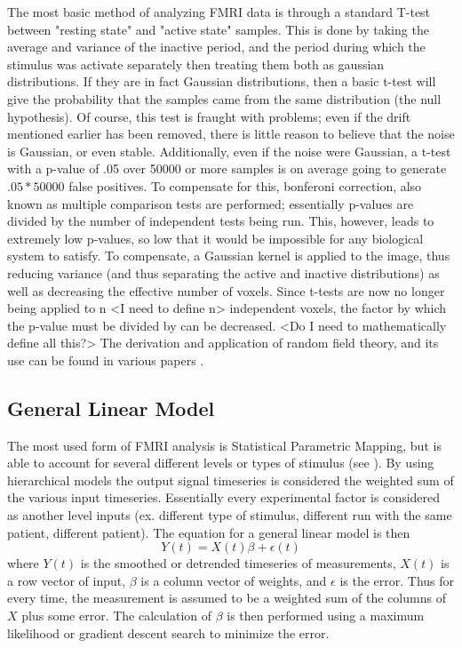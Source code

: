 The most basic method of analyzing FMRI data is through a standard T-test
between "resting state" and "active state" samples. This is done by 
taking the average and variance of the inactive period, and the 
period during which the stimulus was activate separately then treating 
them both as gaussian distributions.
If they are in fact Gaussian distributions, then a basic t-test will
give the probability that the samples came from the same distribution
(the null hypothesis). Of course, this test is fraught with problems; even if
the drift mentioned earlier has been removed, there is little reason
to believe that the noise is Gaussian, or even stable. Additionally, 
even if the noise were Gaussian, a t-test with a p-value of .05 over
50000 or more samples is on average going to generate $.05*50000$ false
positives. To compensate for this, bonferoni correction, also known as
multiple comparison tests are performed; essentially p-values are 
divided by the number of independent
tests being run. This, however, leads to extremely low p-values, so
low that it would be impossible for any biological system to satisfy. To
compensate, a Gaussian kernel is applied to the image, thus reducing
variance (and thus separating the active and inactive distributions)
as well as decreasing the effective number of voxels. Since t-tests are
now no longer being applied to n <I need to define n> independent voxels,
the factor by which the p-value must be divided by can be decreased.
<Do I need to mathematically define all this?> The derivation and application
of random field theory, and its use can be found in various papers \cite{Worsley2004}.

\subsection{General Linear Model}
\label{sec:Current Techniques General Linear Model}
The most used form of FMRI analysis is Statistical Parametric
Mapping, but is able to account for several different levels or types
of stimulus (see \cite{Hofmann1997}). By using hierarchical models
the output signal timeseries is considered the weighted
sum of the various input timeseries. Essentially every experimental factor
is considered as another level inputs (ex. different type of stimulus,
different run with the same patient, different patient). 
The equation for a general linear model is then
\begin{equation}
Y(t) = X(t)\beta + \epsilon(t)
\end{equation}
where $Y(t)$ is the smoothed or detrended timeseries of measurements,
$X(t)$ is a row vector of input, $\beta$ is a column vector of weights,
and $\epsilon$ is the error. Thus for every time, the measurement is
assumed to be a weighted sum of the columns of $X$ plus some error. The calculation
of $\beta$ is then performed using a maximum likelihood or gradient descent search 
to minimize the error.

